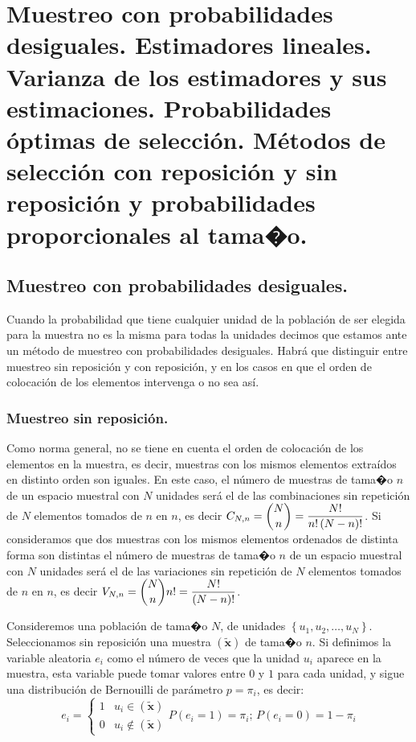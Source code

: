 
\chapter{Muestreo con probabilidades desiguales. Estimadores lineales. Varianza
de los estimadores y sus estimaciones. Probabilidades \'optimas de selecci\'on.
M\'etodos de selecci\'on con reposici\'on y sin reposici\'on y probabilidades
proporcionales al tama�o.}


\section{Muestreo con probabilidades desiguales.}

Cuando la probabilidad que tiene cualquier unidad de la poblaci\'on
de ser elegida para la muestra no es la misma para todas la unidades
decimos que estamos ante un m\'etodo de muestreo con probabilidades
desiguales. Habr\'a que distinguir entre muestreo sin reposici\'on y con
reposici\'on, y en los casos en que el orden de colocaci\'on de los elementos
intervenga o no sea as\'i.


\subsection{Muestreo sin reposici\'on.}

Como norma general, no se tiene en cuenta el orden de colocaci\'on de
los elementos en la muestra, es decir, muestras con los mismos elementos
extra\'idos en distinto orden son iguales. En este caso, el n\'umero de
muestras de tama�o $n$ de un espacio muestral con $N$ unidades ser\'a
el de las combinaciones sin repetici\'on de $N$ elementos tomados de
$n$ en $n$, es decir $C_{N,n}=\dbinom{N}{n}=\dfrac{N!}{n!\left(N-n\right)!}$.
Si consideramos que dos muestras con los mismos elementos ordenados
de distinta forma son distintas el n\'umero de muestras de tama�o $n$
de un espacio muestral con $N$ unidades ser\'a el de las variaciones
sin repetici\'on de $N$ elementos tomados de $n$ en $n$, es decir
$V_{N,n}=\dbinom{N}{n}n!=\dfrac{N!}{\left(N-n\right)!}$.

Consideremos una poblaci\'on de tama�o $N$, de unidades $\left\{ u_{1},u_{2},\ldots,u_{N}\right\} $.
Seleccionamos sin reposici\'on una muestra $\left(\widetilde{\boldsymbol{x}}\right)$
de tama�o $n$. Si definimos la variable aleatoria $e_{i}$ como el
n\'umero de veces que la unidad $u_{i}$ aparece en la muestra, esta
variable puede tomar valores entre $0$ y $1$ para cada unidad, y
sigue una distribuci\'on de Bernouilli de par\'ametro $p=\pi_{i}$, es
decir: 
\[
e_{i}=\begin{cases}
1 & u_{i}\in\left(\widetilde{\boldsymbol{x}}\right)\\
0 & u_{i}\notin\left(\widetilde{\boldsymbol{x}}\right)
\end{cases}P\left(e_{i}=1\right)=\pi_{i};\,P\left(e_{i}=0\right)=1-\pi_{i}
\]


